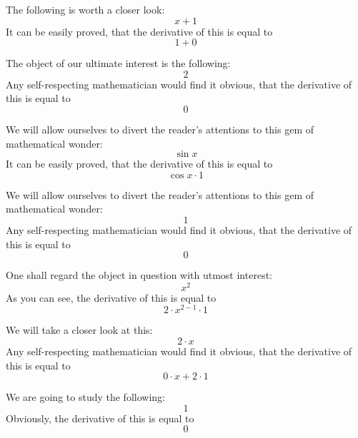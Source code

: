 \documentclass{article}
\begin{document}
The following is worth a closer look:
\begin{equation}
x + 1 
\end{equation}
It can be easily proved, that the derivative of this is equal to
\begin{equation}
1 + 0 
\end{equation}

The object of our ultimate interest is the following:
\begin{equation}
2 
\end{equation}
Any self-respecting mathematician would find it obvious, that the derivative of this is equal to
\begin{equation}
0 
\end{equation}

We will allow ourselves to divert the reader's attentions to this gem of mathematical wonder:
\begin{equation}
\sin x 
\end{equation}
It can be easily proved, that the derivative of this is equal to
\begin{equation}
\cos x \cdot 1 
\end{equation}

We will allow ourselves to divert the reader's attentions to this gem of mathematical wonder:
\begin{equation}
1 
\end{equation}
Any self-respecting mathematician would find it obvious, that the derivative of this is equal to
\begin{equation}
0 
\end{equation}

One shall regard the object in question with utmost interest:
\begin{equation}
x ^{2 } 
\end{equation}
As you can see, the derivative of this is equal to
\begin{equation}
2 \cdot x ^{2 - 1 } \cdot 1 
\end{equation}

We will take a closer look at this:
\begin{equation}
2 \cdot x 
\end{equation}
Any self-respecting mathematician would find it obvious, that the derivative of this is equal to
\begin{equation}
0 \cdot x + 2 \cdot 1 
\end{equation}

We are going to study the following:
\begin{equation}
1 
\end{equation}
Obviously, the derivative of this is equal to
\begin{equation}
0 
\end{equation}
\end{document}
